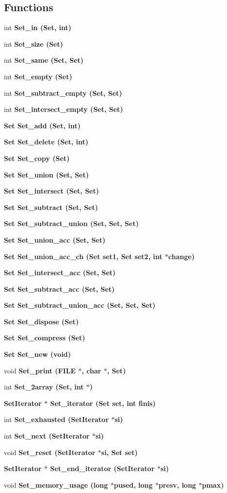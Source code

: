 \subsection*{Functions}
\begin{CompactItemize}
\item 
int \bf{Set\_\-in} (\bf{Set}, int)
\item 
int \bf{Set\_\-size} (\bf{Set})
\item 
int \bf{Set\_\-same} (\bf{Set}, \bf{Set})
\item 
int \bf{Set\_\-empty} (\bf{Set})
\item 
int \bf{Set\_\-subtract\_\-empty} (\bf{Set}, \bf{Set})
\item 
int \bf{Set\_\-intersect\_\-empty} (\bf{Set}, \bf{Set})
\item 
\bf{Set} \bf{Set\_\-add} (\bf{Set}, int)
\item 
\bf{Set} \bf{Set\_\-delete} (\bf{Set}, int)
\item 
\bf{Set} \bf{Set\_\-copy} (\bf{Set})
\item 
\bf{Set} \bf{Set\_\-union} (\bf{Set}, \bf{Set})
\item 
\bf{Set} \bf{Set\_\-intersect} (\bf{Set}, \bf{Set})
\item 
\bf{Set} \bf{Set\_\-subtract} (\bf{Set}, \bf{Set})
\item 
\bf{Set} \bf{Set\_\-subtract\_\-union} (\bf{Set}, \bf{Set}, \bf{Set})
\item 
\bf{Set} \bf{Set\_\-union\_\-acc} (\bf{Set}, \bf{Set})
\item 
\bf{Set} \bf{Set\_\-union\_\-acc\_\-ch} (\bf{Set} set1, \bf{Set} set2, int $\ast$change)
\item 
\bf{Set} \bf{Set\_\-intersect\_\-acc} (\bf{Set}, \bf{Set})
\item 
\bf{Set} \bf{Set\_\-subtract\_\-acc} (\bf{Set}, \bf{Set})
\item 
\bf{Set} \bf{Set\_\-subtract\_\-union\_\-acc} (\bf{Set}, \bf{Set}, \bf{Set})
\item 
\bf{Set} \bf{Set\_\-dispose} (\bf{Set})
\item 
\bf{Set} \bf{Set\_\-compress} (\bf{Set})
\item 
\bf{Set} \bf{Set\_\-new} (void)
\item 
void \bf{Set\_\-print} (FILE $\ast$, char $\ast$, \bf{Set})
\item 
int \bf{Set\_\-2array} (\bf{Set}, int $\ast$)
\item 
\bf{Set\-Iterator} $\ast$ \bf{Set\_\-iterator} (\bf{Set} set, int finis)
\item 
int \bf{Set\_\-exhausted} (\bf{Set\-Iterator} $\ast$si)
\item 
int \bf{Set\_\-next} (\bf{Set\-Iterator} $\ast$si)
\item 
void \bf{Set\_\-reset} (\bf{Set\-Iterator} $\ast$si, \bf{Set} set)
\item 
\bf{Set\-Iterator} $\ast$ \bf{Set\_\-end\_\-iterator} (\bf{Set\-Iterator} $\ast$si)
\item 
void \bf{Set\_\-memory\_\-usage} (long $\ast$pused, long $\ast$presv, long $\ast$pmax)
\end{CompactItemize}


